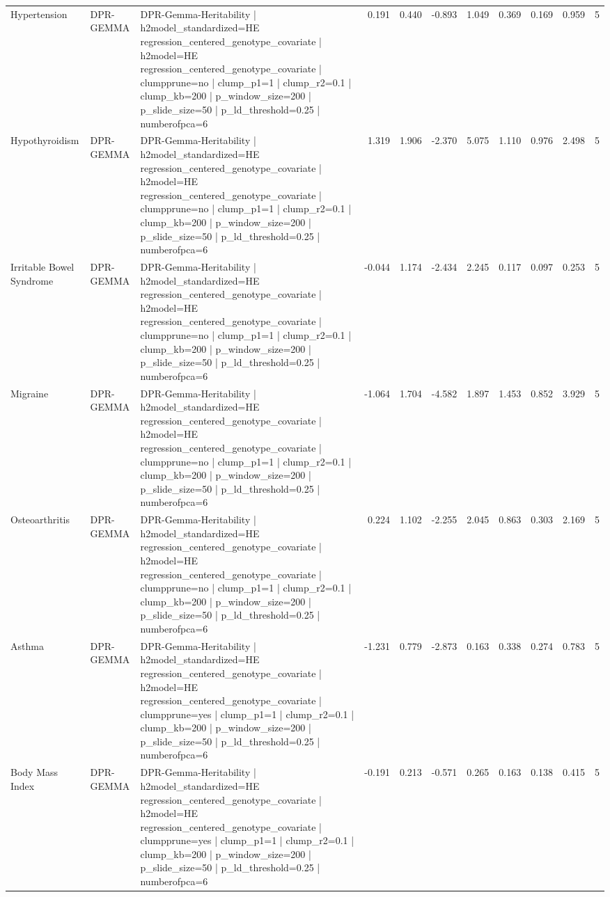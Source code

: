 \begin{landscape}
\begin{longtable}{p{2.4cm}p{1.8cm}p{6.0cm}rrrrrrrr}
Hypertension & DPR-GEMMA & DPR-Gemma-Heritability | h2model\_standardized=HE regression\_centered\_genotype\_covariate | h2model=HE regression\_centered\_genotype\_covariate | clumpprune=no | clump\_p1=1 | clump\_r2=0.1 | clump\_kb=200 | p\_window\_size=200 | p\_slide\_size=50 | p\_ld\_threshold=0.25 | numberofpca=6 & 0.191 & 0.440 & -0.893 & 1.049 & 0.369 & 0.169 & 0.959 & 5 \\
Hypothyroidism & DPR-GEMMA & DPR-Gemma-Heritability | h2model\_standardized=HE regression\_centered\_genotype\_covariate | h2model=HE regression\_centered\_genotype\_covariate | clumpprune=no | clump\_p1=1 | clump\_r2=0.1 | clump\_kb=200 | p\_window\_size=200 | p\_slide\_size=50 | p\_ld\_threshold=0.25 | numberofpca=6 & 1.319 & 1.906 & -2.370 & 5.075 & 1.110 & 0.976 & 2.498 & 5 \\
Irritable Bowel Syndrome & DPR-GEMMA & DPR-Gemma-Heritability | h2model\_standardized=HE regression\_centered\_genotype\_covariate | h2model=HE regression\_centered\_genotype\_covariate | clumpprune=no | clump\_p1=1 | clump\_r2=0.1 | clump\_kb=200 | p\_window\_size=200 | p\_slide\_size=50 | p\_ld\_threshold=0.25 | numberofpca=6 & -0.044 & 1.174 & -2.434 & 2.245 & 0.117 & 0.097 & 0.253 & 5 \\
Migraine & DPR-GEMMA & DPR-Gemma-Heritability | h2model\_standardized=HE regression\_centered\_genotype\_covariate | h2model=HE regression\_centered\_genotype\_covariate | clumpprune=no | clump\_p1=1 | clump\_r2=0.1 | clump\_kb=200 | p\_window\_size=200 | p\_slide\_size=50 | p\_ld\_threshold=0.25 | numberofpca=6 & -1.064 & 1.704 & -4.582 & 1.897 & 1.453 & 0.852 & 3.929 & 5 \\
Osteoarthritis & DPR-GEMMA & DPR-Gemma-Heritability | h2model\_standardized=HE regression\_centered\_genotype\_covariate | h2model=HE regression\_centered\_genotype\_covariate | clumpprune=no | clump\_p1=1 | clump\_r2=0.1 | clump\_kb=200 | p\_window\_size=200 | p\_slide\_size=50 | p\_ld\_threshold=0.25 | numberofpca=6 & 0.224 & 1.102 & -2.255 & 2.045 & 0.863 & 0.303 & 2.169 & 5 \\
Asthma & DPR-GEMMA & DPR-Gemma-Heritability | h2model\_standardized=HE regression\_centered\_genotype\_covariate | h2model=HE regression\_centered\_genotype\_covariate | clumpprune=yes | clump\_p1=1 | clump\_r2=0.1 | clump\_kb=200 | p\_window\_size=200 | p\_slide\_size=50 | p\_ld\_threshold=0.25 | numberofpca=6 & -1.231 & 0.779 & -2.873 & 0.163 & 0.338 & 0.274 & 0.783 & 5 \\
Body Mass Index & DPR-GEMMA & DPR-Gemma-Heritability | h2model\_standardized=HE regression\_centered\_genotype\_covariate | h2model=HE regression\_centered\_genotype\_covariate | clumpprune=yes | clump\_p1=1 | clump\_r2=0.1 | clump\_kb=200 | p\_window\_size=200 | p\_slide\_size=50 | p\_ld\_threshold=0.25 | numberofpca=6 & -0.191 & 0.213 & -0.571 & 0.265 & 0.163 & 0.138 & 0.415 & 5 \\

\end{longtable}
\end{landscape}
